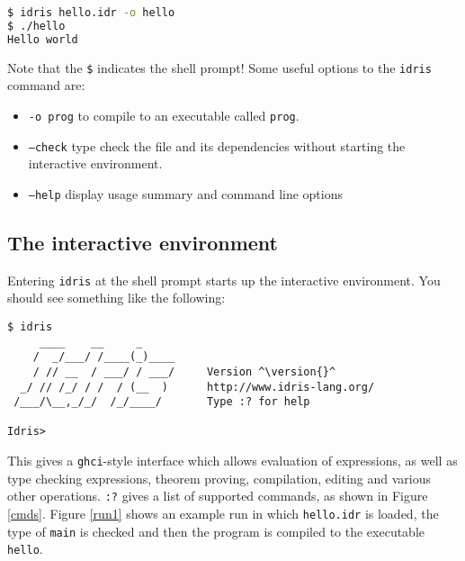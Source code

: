 \begin{lstlisting}[language=bash]
$ idris hello.idr -o hello
$ ./hello
Hello world
\end{lstlisting}

\noindent
Note that the \texttt{\$} indicates the shell prompt! Some useful options to the
\texttt{idris} command are:

\begin{itemize}
\item \texttt{-o prog} to compile to an executable called \texttt{prog}.
\item \texttt{--check} type check the file and its dependencies without starting the 
interactive environment.
\item \texttt{--help} display usage summary and command line options
\end{itemize}

\subsection{The interactive environment}

Entering \texttt{idris} at the shell prompt starts up the interactive
environment. You should see something like the following:

\begin{lstlisting}[escapechar=^]
$ idris
     ____    __     _                                          
    /  _/___/ /____(_)____                                     
    / // __  / ___/ / ___/     Version ^\version{}^
  _/ // /_/ / /  / (__  )      http://www.idris-lang.org/      
 /___/\__,_/_/  /_/____/       Type :? for help      

Idris>
\end{lstlisting}

\noindent
This gives a \texttt{ghci}-style interface which allows evaluation of expressions,
as well as type checking expressions, theorem proving, compilation, editing
and various other operations. \texttt{:?} gives a list of supported commands,
as shown in Figure \ref{cmds}. Figure \ref{run1} shows an example run in which
\texttt{hello.idr} is loaded, the type of \texttt{main} is checked and then
the program is compiled to the executable \texttt{hello}.

